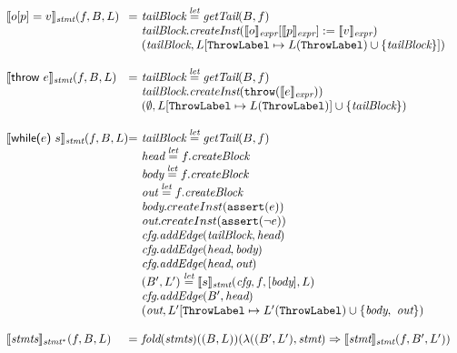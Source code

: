 \[
\begin{array}{l@{}l@{~}l}
\transfun{\irstore{o}{p}{v}}_{\emph{stmt}}(f, B, L)
& = & \emph{tailBlock} \letval \getTail(B, f)\\
& & \emph{tailBlock}.\emph{createInst}(\transfun{o}_{\emph{expr}}[\transfun{p}_{\emph{expr}}] := \transfun{v}_{\emph{expr}})\\
& & (\emph{tailBlock}, L[\ThrowLabel \mapsto L(\ThrowLabel) \cup \{ \emph{tailBlock} \}])\\
& & \\

\transfun{\irthrow{e}}_{\emph{stmt}}(f, B, L)
& = & \emph{tailBlock} \letval \getTail(B, f)\\
& & \emph{tailBlock}.\emph{createInst}(\TT{throw}(\transfun{e}_{\emph{expr}}))\\
& & (\emptyset, L[\ThrowLabel \mapsto L(\ThrowLabel)] \cup \{ \emph{tailBlock} \})\\
& & \\

\transfun{\ircfgwhile{e}{s}}_{\emph{stmt}}(f, B, L)
& = & \emph{tailBlock} \letval \getTail(B, f)\\
& & \emph{head} \letval f.\emph{createBlock}\\
& & \emph{body} \letval f.\emph{createBlock}\\
& & \emph{out} \letval f.\emph{createBlock}\\
& & \emph{body}.createInst(\TT{assert}(e))\\
& & \emph{out}.createInst(\TT{assert}(\neg e))\\
& & \emph{cfg}.\emph{addEdge}(\emph{tailBlock}, \emph{head})\\
& & \emph{cfg}.\emph{addEdge}(\emph{head}, \emph{body})\\
& & \emph{cfg}.\emph{addEdge}(\emph{head}, \emph{out})\\
& & (B', L') \letval \transfun{s}_{\emph{stmt}}(\emph{cfg}, f, [\emph{body}], L)\\
& & \emph{cfg}.\emph{addEdge}(B', \emph{head})\\
& & (\emph{out}, L'[\ThrowLabel \mapsto L'(\ThrowLabel) \cup \{ \emph{body},\ \emph{out} \}) \\
& & \\

\transfun{\emph{stmts}}_{\emph{stmt}^{*}}(f, B, L)
& = & \fold(\emph{stmts})((B, L))(\lambda((B', L'), \emph{stmt}) \Rightarrow \transfun{\emph{stmt}}_{\emph{stmt}}(f, B', L'))\\
& & \\


\end{array}\]
